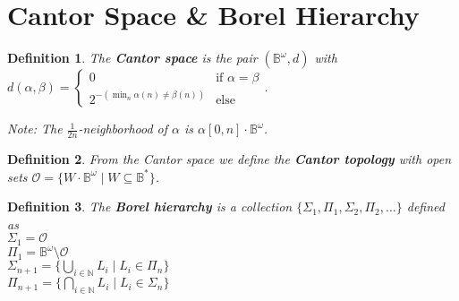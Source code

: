 \documentclass{article}
\newtheorem{definition}{Definition}
\begin{document}
\section{Cantor Space \& Borel Hierarchy}
\begin{definition}
	The \textbf{Cantor space} is the pair $(\mathbb{B}^\omega, d)$ with $d(\alpha, \beta) = \begin{cases} 0 & \text{if } \alpha = \beta \\ 2^{-(\min_n \alpha(n) \neq \beta(n))} & \text{else}  \end{cases}$. 
	
	Note: The $\frac{1}{2n}$-neighborhood of $\alpha$ is $\alpha[0, n] \cdot \mathbb{B}^\omega$.
\end{definition}

\begin{definition}
	From the Cantor space we define the \textbf{Cantor topology} with open sets $\mathcal{O} = \{W \cdot \mathbb{B}^\omega \mid W \subseteq \mathbb{B}^*\}$.
\end{definition}

\begin{definition}
	The \textbf{Borel hierarchy} is a collection $\{ \Sigma_1, \Pi_1, \Sigma_2, \Pi_2, \dots \}$ defined as \\
	$\Sigma_1 = \mathcal{O}$ \\
	$\Pi_1 = \mathbb{B}^\omega \setminus \mathcal{O}$ \\
	$\Sigma_{n+1} = \{ \bigcup_{i \in \mathbb{N}} L_i \mid L_i \in \Pi_n \}$ \\
	$\Pi_{n+1} = \{ \bigcap_{i \in \mathbb{N}} L_i \mid L_i \in \Sigma_n \}$
\end{definition}
\end{document}
